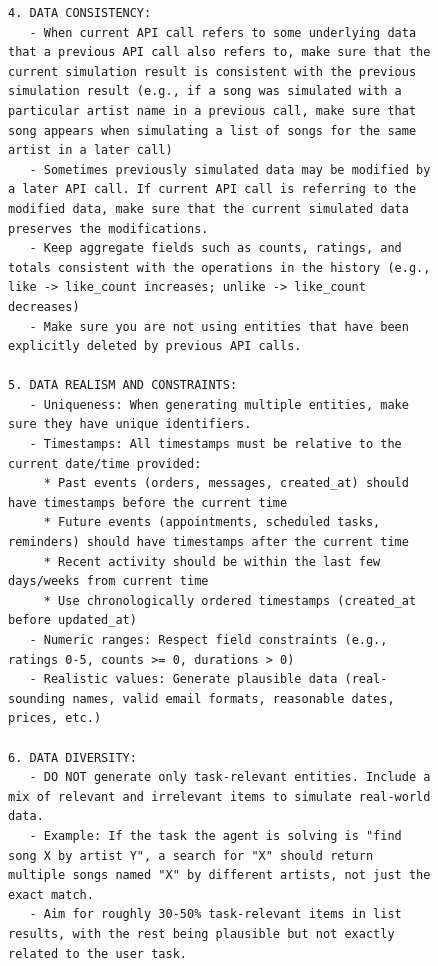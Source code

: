 \begin{figure}[t]
\begin{lstlisting}[style=prettyprompt, captionpos=b, caption={Simulation rules (2/2): data consistency, realism, and diversity.}, label={lst:sim_rules_b}]
4. DATA CONSISTENCY:
   - When current API call refers to some underlying data that a previous API call also refers to, make sure that the current simulation result is consistent with the previous simulation result (e.g., if a song was simulated with a particular artist name in a previous call, make sure that song appears when simulating a list of songs for the same artist in a later call)
   - Sometimes previously simulated data may be modified by a later API call. If current API call is referring to the modified data, make sure that the current simulated data preserves the modifications.
   - Keep aggregate fields such as counts, ratings, and totals consistent with the operations in the history (e.g., like -> like_count increases; unlike -> like_count decreases)
   - Make sure you are not using entities that have been explicitly deleted by previous API calls.

5. DATA REALISM AND CONSTRAINTS:
   - Uniqueness: When generating multiple entities, make sure they have unique identifiers.
   - Timestamps: All timestamps must be relative to the current date/time provided:
     * Past events (orders, messages, created_at) should have timestamps before the current time
     * Future events (appointments, scheduled tasks, reminders) should have timestamps after the current time
     * Recent activity should be within the last few days/weeks from current time
     * Use chronologically ordered timestamps (created_at before updated_at)
   - Numeric ranges: Respect field constraints (e.g., ratings 0-5, counts >= 0, durations > 0)
   - Realistic values: Generate plausible data (real-sounding names, valid email formats, reasonable dates, prices, etc.)

6. DATA DIVERSITY:
   - DO NOT generate only task-relevant entities. Include a mix of relevant and irrelevant items to simulate real-world data.
   - Example: If the task the agent is solving is "find song X by artist Y", a search for "X" should return multiple songs named "X" by different artists, not just the exact match.
   - Aim for roughly 30-50% task-relevant items in list results, with the rest being plausible but not exactly related to the user task.
\end{lstlisting}
\end{figure}



